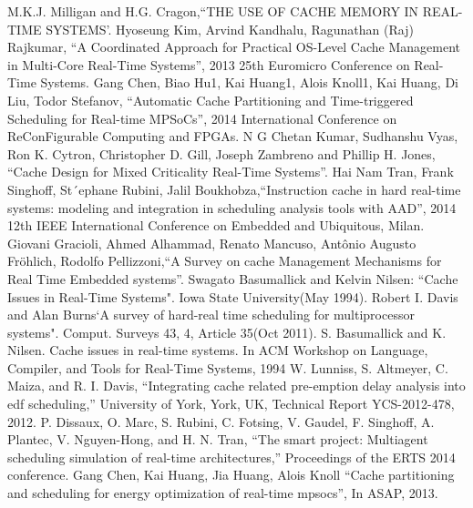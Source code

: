 \documentclass[conference]{IEEEtran}
\begin{document}
\begin{thebibliography}{00}
  M.K.J. Milligan and H.G. Cragon,``THE USE OF CACHE MEMORY IN REAL-TIME SYSTEMS'.
 Hyoseung Kim, Arvind Kandhalu, Ragunathan (Raj) Rajkumar, ``A Coordinated Approach for Practical OS-Level Cache Management in Multi-Core Real-Time Systems'', 2013 25th Euromicro Conference on Real-Time Systems.
 Gang Chen, Biao Hu1, Kai Huang1, Alois Knoll1, Kai Huang, Di Liu, Todor Stefanov, ``Automatic Cache Partitioning and Time-triggered Scheduling for Real-time MPSoCs'', 2014 International Conference on ReConFigurable Computing and FPGAs.
 N G Chetan Kumar, Sudhanshu Vyas, Ron K. Cytron, Christopher D. Gill, Joseph Zambreno and Phillip H. Jones, ``Cache Design for Mixed Criticality Real-Time Systems''.
 Hai Nam Tran, Frank Singhoff, St´ephane Rubini, Jalil Boukhobza,``Instruction cache in hard real-time systems: modeling and integration in scheduling analysis tools with AAD'', 2014 12th IEEE International Conference on Embedded and Ubiquitous, Milan.
 Giovani Gracioli, Ahmed  Alhammad, Renato  Mancuso, Antônio Augusto Fröhlich, Rodolfo  Pellizzoni,``A Survey on cache Management Mechanisms for Real Time Embedded systems''.
 Swagato Basumallick and Kelvin Nilsen: ``Cache Issues in Real-Time Systems". Iowa State University(May 1994).
 Robert I. Davis and Alan Burns`A survey of hard-real time scheduling for multiprocessor systems". Comput. Surveys 43, 4, Article 35(Oct 2011).
S. Basumallick and K. Nilsen. Cache issues in real-time systems. In ACM Workshop on Language, Compiler, and Tools for Real-Time Systems, 1994
 W. Lunniss, S. Altmeyer, C. Maiza, and R. I. Davis, “Integrating cache related pre-emption delay analysis into edf scheduling,” University of York, York, UK, Technical Report YCS-2012-478, 2012.
 P. Dissaux, O. Marc, S. Rubini, C. Fotsing, V. Gaudel, F. Singhoff, A. Plantec, V. Nguyen-Hong, and H. N. Tran, “The smart project: Multiagent scheduling simulation of real-time architectures,” Proceedings of the ERTS 2014 conference.
 Gang Chen, Kai Huang, Jia Huang, Alois Knoll ``Cache partitioning and scheduling for energy optimization of real-time mpsocs'', In ASAP, 2013.
\end{thebibliography}
\end{document}
